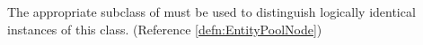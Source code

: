 The appropriate subclass of  must be used
  to distinguish logically identical instances of this class.  (Reference \ref{defn:EntityPoolNode})